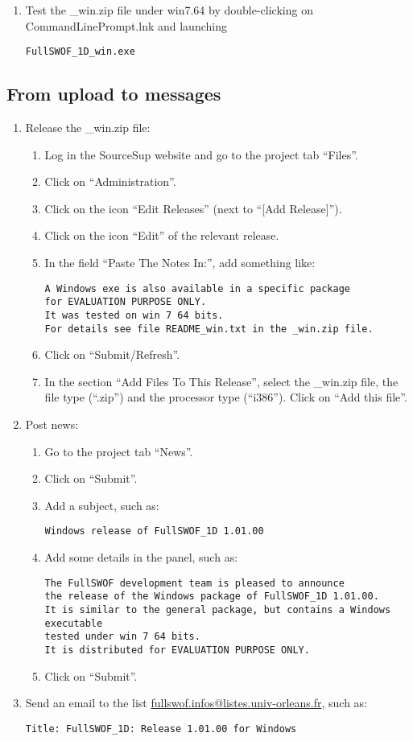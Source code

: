 \documentclass[a4paper, 11pt]{article}
\begin{document}
\begin{enumerate}
\item Test the \_win.zip file under win7.64 by
double-clicking on CommandLinePrompt.lnk and launching
\begin{verbatim}
FullSWOF_1D_win.exe
\end{verbatim}
\end{enumerate}

\subsection{From upload to messages}
\begin{enumerate}
\item Release the \_win.zip file:
\begin{enumerate}
\item Log in the SourceSup website and go to the project tab ``Files''.
\item Click on ``Administration''.
\item Click on the icon ``Edit Releases'' (next to ``[Add Release]'').
\item Click on the icon ``Edit'' of the relevant release.
\item In the field ``Paste The Notes In:'', add something like:
\begin{verbatim}
A Windows exe is also available in a specific package 
for EVALUATION PURPOSE ONLY.
It was tested on win 7 64 bits.
For details see file README_win.txt in the _win.zip file.
\end{verbatim}
\item Click on ``Submit/Refresh''.
\item In the section ``Add Files To This Release'', select the \_win.zip file,
the file type (``.zip'') and the processor type  (``i386''). Click on ``Add this file''.
\end{enumerate}
\item Post news:
\begin{enumerate}
\item Go to the project tab ``News''.
\item Click on ``Submit''.
\item Add a subject, such as:
\begin{verbatim}
Windows release of FullSWOF_1D 1.01.00
\end{verbatim}
\item Add some details in the panel, such as:
\begin{verbatim}
The FullSWOF development team is pleased to announce
the release of the Windows package of FullSWOF_1D 1.01.00.
It is similar to the general package, but contains a Windows executable 
tested under win 7 64 bits.
It is distributed for EVALUATION PURPOSE ONLY.
\end{verbatim}
\item Click on ``Submit''.
\end{enumerate}
\item Send an email to the list
\href{mailto:fullswof.infos@listes.univ-orleans.fr}{fullswof.infos@listes.univ-orleans.fr}, such as:
\begin{verbatim}
Title: FullSWOF_1D: Release 1.01.00 for Windows


\end{verbatim}
\end{enumerate}
\end{document}
